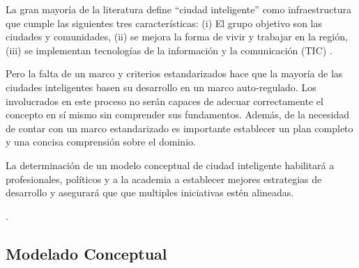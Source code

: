 \documentclass[a4paper,fleqn,spanish]{cas-dc}
\begin{document}
La gran mayoría de la literatura define “ciudad inteligente” como
infraestructura que cumple las siguientes tres características:
(i) El grupo objetivo son las ciudades y comunidades,
(ii) se mejora la forma de vivir y trabajar en la región,
(iii) se implementan tecnologías de la información y la comunicación (TIC)
\cite{stubinger_understanding_2020}.

Pero la falta de un marco y criterios estandarizados
hace que la mayoría de las ciudades inteligentes basen su
desarrollo en un marco auto-regulado.
Los involucrados en este proceso
no serán capaces de adecuar correctamente el concepto
en sí mismo sin comprender sus fundamentos.
Además, de la necesidad de contar con un marco estandarizado
es importante establecer un plan completo y
una concisa comprensión sobre el dominio.

La determinación de un modelo conceptual de ciudad inteligente
habilitará a profesionales, políticos y a la academia
a establecer mejores estrategias de desarrollo
y asegurará que que multiples iniciativas estén alineadas.

.







\subsection{Modelado Conceptual}\label{afirmacion}
\end{document}
